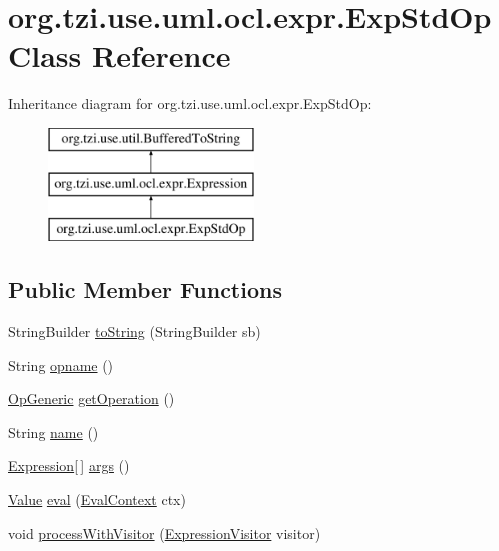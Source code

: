 \hypertarget{classorg_1_1tzi_1_1use_1_1uml_1_1ocl_1_1expr_1_1_exp_std_op}{\section{org.\-tzi.\-use.\-uml.\-ocl.\-expr.\-Exp\-Std\-Op Class Reference}
\label{classorg_1_1tzi_1_1use_1_1uml_1_1ocl_1_1expr_1_1_exp_std_op}
}
Inheritance diagram for org.\-tzi.\-use.\-uml.\-ocl.\-expr.\-Exp\-Std\-Op\-:\begin{figure}[H]
\begin{center}
\leavevmode
\includegraphics[height=3.000000cm]{classorg_1_1tzi_1_1use_1_1uml_1_1ocl_1_1expr_1_1_exp_std_op}
\end{center}
\end{figure}
\subsection*{Public Member Functions}
\begin{DoxyCompactItemize}
\item 
String\-Builder \hyperlink{classorg_1_1tzi_1_1use_1_1uml_1_1ocl_1_1expr_1_1_exp_std_op_a73ce6c407dcb90c3c534852ffe478d8b}{to\-String} (String\-Builder sb)
\item 
String \hyperlink{classorg_1_1tzi_1_1use_1_1uml_1_1ocl_1_1expr_1_1_exp_std_op_a25005955bc2d1f4b652d3e0e7b5a557f}{opname} ()
\item 
\hyperlink{classorg_1_1tzi_1_1use_1_1uml_1_1ocl_1_1expr_1_1operations_1_1_op_generic}{Op\-Generic} \hyperlink{classorg_1_1tzi_1_1use_1_1uml_1_1ocl_1_1expr_1_1_exp_std_op_aead5fcd75b959eab7375456f90c64aa8}{get\-Operation} ()
\item 
String \hyperlink{classorg_1_1tzi_1_1use_1_1uml_1_1ocl_1_1expr_1_1_exp_std_op_adf3a0a06fa248affedc13e555ee040fa}{name} ()
\item 
\hyperlink{classorg_1_1tzi_1_1use_1_1uml_1_1ocl_1_1expr_1_1_expression}{Expression}\mbox{[}$\,$\mbox{]} \hyperlink{classorg_1_1tzi_1_1use_1_1uml_1_1ocl_1_1expr_1_1_exp_std_op_a7480d81e23761f17d031c8225e34119d}{args} ()
\item 
\hyperlink{classorg_1_1tzi_1_1use_1_1uml_1_1ocl_1_1value_1_1_value}{Value} \hyperlink{classorg_1_1tzi_1_1use_1_1uml_1_1ocl_1_1expr_1_1_exp_std_op_a2d873ef095fc503af50af983797bfa3d}{eval} (\hyperlink{classorg_1_1tzi_1_1use_1_1uml_1_1ocl_1_1expr_1_1_eval_context}{Eval\-Context} ctx)
\item 
void \hyperlink{classorg_1_1tzi_1_1use_1_1uml_1_1ocl_1_1expr_1_1_exp_std_op_a48cc98b7dd03d4210ebe756c628fbaeb}{process\-With\-Visitor} (\hyperlink{interfaceorg_1_1tzi_1_1use_1_1uml_1_1ocl_1_1expr_1_1_expression_visitor}{Expression\-Visitor} visitor)
\end{DoxyCompactItemize}

